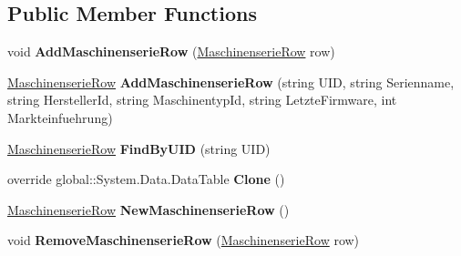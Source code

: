 \subsection*{Public Member Functions}
\begin{DoxyCompactItemize}
\item 
void {\bfseries Add\+Maschinenserie\+Row} (\hyperlink{class_products_1_1_data_1_1ds_sage_1_1_maschinenserie_row}{Maschinenserie\+Row} row)\hypertarget{class_products_1_1_data_1_1ds_sage_1_1_maschinenserie_data_table_a3d76941d6e42032ee9b9cf7561f89b00}{}\label{class_products_1_1_data_1_1ds_sage_1_1_maschinenserie_data_table_a3d76941d6e42032ee9b9cf7561f89b00}

\item 
\hyperlink{class_products_1_1_data_1_1ds_sage_1_1_maschinenserie_row}{Maschinenserie\+Row} {\bfseries Add\+Maschinenserie\+Row} (string U\+ID, string Serienname, string Hersteller\+Id, string Maschinentyp\+Id, string Letzte\+Firmware, int Markteinfuehrung)\hypertarget{class_products_1_1_data_1_1ds_sage_1_1_maschinenserie_data_table_aaf5b6af8d49cd71824da784874d9e3d2}{}\label{class_products_1_1_data_1_1ds_sage_1_1_maschinenserie_data_table_aaf5b6af8d49cd71824da784874d9e3d2}

\item 
\hyperlink{class_products_1_1_data_1_1ds_sage_1_1_maschinenserie_row}{Maschinenserie\+Row} {\bfseries Find\+By\+U\+ID} (string U\+ID)\hypertarget{class_products_1_1_data_1_1ds_sage_1_1_maschinenserie_data_table_a53bf6cf3220865974896a776f96cc8bc}{}\label{class_products_1_1_data_1_1ds_sage_1_1_maschinenserie_data_table_a53bf6cf3220865974896a776f96cc8bc}

\item 
override global\+::\+System.\+Data.\+Data\+Table {\bfseries Clone} ()\hypertarget{class_products_1_1_data_1_1ds_sage_1_1_maschinenserie_data_table_ab87df64781df06349f231a8ca2dde66f}{}\label{class_products_1_1_data_1_1ds_sage_1_1_maschinenserie_data_table_ab87df64781df06349f231a8ca2dde66f}

\item 
\hyperlink{class_products_1_1_data_1_1ds_sage_1_1_maschinenserie_row}{Maschinenserie\+Row} {\bfseries New\+Maschinenserie\+Row} ()\hypertarget{class_products_1_1_data_1_1ds_sage_1_1_maschinenserie_data_table_a039cbdd6ba8ef00509e3a7eb99c4cd8c}{}\label{class_products_1_1_data_1_1ds_sage_1_1_maschinenserie_data_table_a039cbdd6ba8ef00509e3a7eb99c4cd8c}

\item 
void {\bfseries Remove\+Maschinenserie\+Row} (\hyperlink{class_products_1_1_data_1_1ds_sage_1_1_maschinenserie_row}{Maschinenserie\+Row} row)\hypertarget{class_products_1_1_data_1_1ds_sage_1_1_maschinenserie_data_table_aa1fcbd2f4f3465698d30ef6d1cfd6416}{}\label{class_products_1_1_data_1_1ds_sage_1_1_maschinenserie_data_table_aa1fcbd2f4f3465698d30ef6d1cfd6416}

\end{DoxyCompactItemize}
